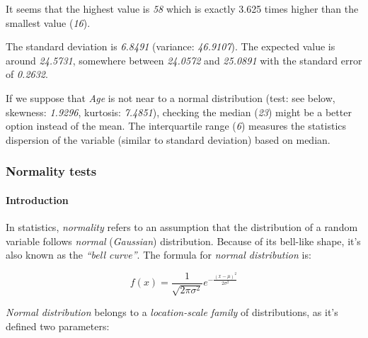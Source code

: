 \documentclass[]{article}
\begin{document}
It seems that the highest value is \emph{58} which is exactly 3.625
times higher than the smallest value (\emph{16}).

The standard deviation is \emph{6.8491} (variance: \emph{46.9107}). The
expected value is around \emph{24.5731}, somewhere between
\emph{24.0572} and \emph{25.0891} with the standard error of
\emph{0.2632}.

If we suppose that \emph{Age} is not near to a normal distribution
(test: see below, skewness: \emph{1.9296}, kurtosis: \emph{7.4851}),
checking the median (\emph{23}) might be a better option instead of the
mean. The interquartile range (\emph{6}) measures the statistics
dispersion of the variable (similar to standard deviation) based on
median.

\subsubsection{Normality tests}

\paragraph{Introduction}

In statistics, \emph{normality} refers to an assumption that the
distribution of a random variable follows \emph{normal}
(\emph{Gaussian}) distribution. Because of its bell-like shape, it's
also known as the \emph{``bell curve''}. The formula for \emph{normal
distribution} is:

\[f(x) = \frac{1}{\sqrt{2\pi{}\sigma{}^2}} e^{-\frac{(x-\mu{})^2}{2\sigma{}^2}}\]

\emph{Normal distribution} belongs to a \emph{location-scale family} of
distributions, as it's defined two parameters:
\end{document}
